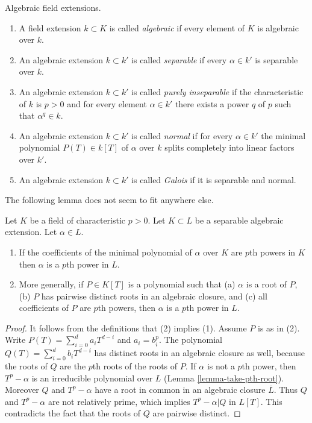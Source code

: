 \begin{definition}
\label{definition-separable-algebraic}
Algebraic field extensions.
\begin{enumerate}
\item A field extension $k \subset K$ is called {\it algebraic}
if every element of $K$ is algebraic over $k$.
\item An algebraic extension $k \subset k'$ is called {\it separable}
if every $\alpha \in k'$ is separable over $k$.
\item An algebraic
extension $k \subset k'$ is called {\it purely inseparable} if
the characteristic of $k$ is $p > 0$ and for every element
$\alpha \in k'$ there exists a power $q$ of $p$ such that
$\alpha^q \in k$.
\item An algebraic extension $k \subset k'$ is called {\it normal}
if for every $\alpha \in k'$ the minimal polynomial $P(T) \in k[T]$
of $\alpha$ over $k$ splits completely into linear factors over $k'$.
\item An algebraic extension $k \subset k'$ is called {\it Galois}
if it is separable and normal.
\end{enumerate}
\end{definition}

\noindent
The following lemma does not seem to fit anywhere else.

\begin{lemma}
\label{lemma-pth-root}
Let $K$ be a field of characteristic $p > 0$. Let $K \subset L$ be a separable
algebraic extension. Let $\alpha \in L$.
\begin{enumerate}
\item If the coefficients of the minimal polynomial of $\alpha$
over $K$ are $p$th powers in $K$ then $\alpha$ is a $p$th
power in $L$.
\item More generally, if $P \in K[T]$ is a polynomial such that (a) $\alpha$
is a root of $P$, (b) $P$ has pairwise distinct roots in an algebraic closure,
and (c) all coefficients of $P$ are $p$th powers, then $\alpha$ is a
$p$th power in $L$.
\end{enumerate}
\end{lemma}

\begin{proof}
It follows from the definitions that (2) implies (1). Assume $P$ is as in (2).
Write $P(T) = \sum\nolimits_{i = 0}^d a_i T^{d - i}$ and $a_i = b_i^p$.
The polynomial $Q(T) = \sum\nolimits_{i = 0}^d b_i T^{d - i}$ has distinct
roots in an algebraic closure as well, because the roots of $Q$
are the $p$th roots of the roots of $P$. If $\alpha$ is not a $p$th power,
then $T^p - \alpha$ is an irreducible polynomial over $L$
(Lemma \ref{lemma-take-pth-root}).
Moreover $Q$ and $T^p - \alpha$ have a root in common in
an algebraic closure $\overline{L}$.
Thus $Q$ and $T^p - \alpha$ are not relatively prime, which
implies $T^p - \alpha | Q$ in $L[T]$. This contradicts the fact that
the roots of $Q$ are pairwise distinct.
\end{proof}


















